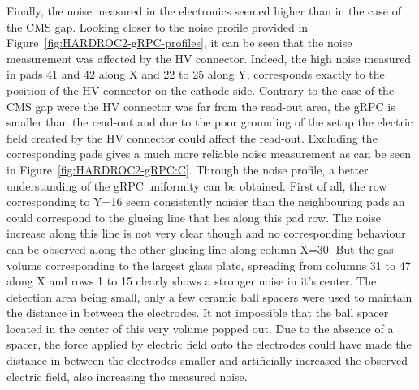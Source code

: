 	Finally, the noise measured in the electronics seemed higher than in the case of the CMS gap. Looking closer to the noise profile provided in Figure~\ref{fig:HARDROC2-gRPC-profiles}, it can be seen that the noise measurement was affected by the HV connector. Indeed, the high noise measured in pads 41 and 42 along X and 22 to 25 along Y, corresponds exactly to the position of the HV connector on the cathode side. Contrary to the case of the CMS gap were the HV connector was far from the read-out area, the gRPC is smaller than the read-out and due to the poor grounding of the setup the electric field created by the HV connector could affect the read-out. Excluding the corresponding pads gives a much more reliable noise measurement as can be seen in Figure~\ref{fig:HARDROC2-gRPC:C}. Through the noise profile, a better understanding of the gRPC uniformity can be obtained. First of all, the row corresponding to Y=16 seem consistently noisier than the neighbouring pads an could correspond to the glueing line that lies along this pad row. The noise increase along this line is not very clear though and no corresponding behaviour can be observed along the other glueing line along column X=30. But the gas volume corresponding to the largest glass plate, spreading from columns 31 to 47 along X and rows 1 to 15 clearly shows a stronger noise in it's center. The detection area being small, only a few ceramic ball spacers were used to maintain the distance in between the electrodes. It not impossible that the ball spacer located in the center of this very volume popped out. Due to the absence of a spacer, the force applied by electric field onto the electrodes could have made the distance in between the electrodes smaller and artificially increased the observed electric field, also increasing the measured noise.
	 
